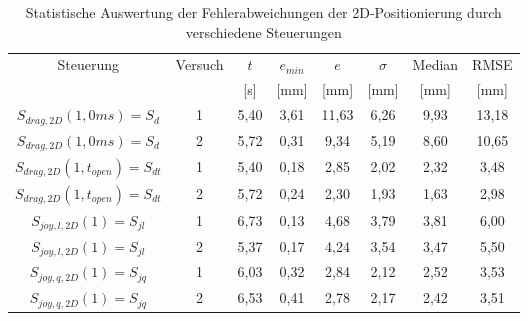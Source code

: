 \begin{table}[htb]
	\caption{Statistische Auswertung der Fehlerabweichungen der 2D-Positionierung durch verschiedene Steuerungen}
	\label{table pos 2d}
	\begin{center}
		\begin{tabular}{|c|c|c|c|c|c|c|c|}
			\hline 
			Steuerung & Versuch & $t$ & $e_{min}$ & $e$  & $\sigma$ & Median & RMSE \\ 
			&  & [s] & [mm] & [mm] & [mm] & [mm] & [mm] \\
			\hline 
			$S_{drag,2D}(1,0ms)=S_{d}$ & 1 & 5,40 & 3,61 & 11,63 & 6,26 & 9,93 & 13,18  \\ 
			\hline
			$S_{drag,2D}(1,0ms)=S_{d}$ & 2 & 5,72 & 0,31 & 9,34 & 5,19 & 8,60 & 10,65  \\ 
			\hline 
			$S_{drag,2D}(1,t_{open})=S_{dt}$ & 1 & 5,40 & 0,18 & 2,85 & 2,02 & 2,32 & 3,48 \\ 
			\hline 
			$S_{drag,2D}(1,t_{open})=S_{dt}$ & 2 & 5,72 & 0,24 & 2,30 & 1,93 & 1,63 & 2,98 \\ 
			\hline 
			$S_{joy,l,2D}(1)=S_{jl}$ & 1 & 6,73 & 0,13 & 4,68 & 3,79 & 3,81 & 6,00 \\ 
			\hline 
			$S_{joy,l,2D}(1)=S_{jl}$ & 2 & 5,37 & 0,17 & 4,24 & 3,54 & 3,47 & 5,50 \\ 
			\hline 
			$S_{joy,q,2D}(1)=S_{jq}$ & 1 & 6,03 & 0,32 & 2,84 & 2,12 & 2,52 & 3,53 \\ 
			\hline 
			$S_{joy,q,2D}(1)=S_{jq}$ & 2 & 6,53 & 0,41 & 2,78 & 2,17 & 2,42 & 3,51 \\ 
			\hline 
		\end{tabular} 
	\end{center}
\end{table}

